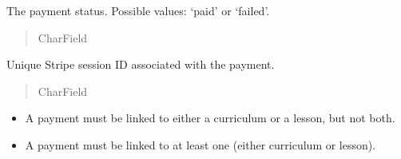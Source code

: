 \documentclass[letterpaper,10pt,english]{sphinxmanual}
\begin{document}
\begin{fulllineitems}
\begin{fulllineitems}
\begin{quote}
\begin{description}
\end{description}\end{quote}

\end{fulllineitems}


\begin{fulllineitems}
\label{\detokenize{payments:payments.models.Payment.status}}
\pysigstartsignatures
\pysigline
{}
\pysigstopsignatures
\sphinxAtStartPar
The payment status. Possible values: ‘paid’ or ‘failed’.
\begin{quote}\begin{description}
\sphinxAtStartPar
CharField

\end{description}\end{quote}

\end{fulllineitems}


\begin{fulllineitems}
\label{\detokenize{payments:payments.models.Payment.stripe_checkout_id}}
\pysigstartsignatures
\pysigline
{}
\pysigstopsignatures
\sphinxAtStartPar
Unique Stripe session ID associated with the payment.
\begin{quote}\begin{description}
\sphinxAtStartPar
CharField

\end{description}\end{quote}

\end{fulllineitems}

\begin{description}
\begin{itemize}
\item {} 
\sphinxAtStartPar
A payment must be linked to either a curriculum or a lesson, but not both.

\item {} 
\sphinxAtStartPar
A payment must be linked to at least one (either curriculum or lesson).


\end{itemize}
\end{description}
\end{fulllineitems}
\end{document}
